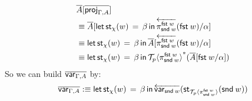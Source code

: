 \documentclass[10pt]{article}
\theoremstyle{definition}
\newcommand\dsd[1]{\ensuremath{\mathsf{#1}}}
\newcommand{\app}[2]{\ensuremath{#1 \: #2}}
\newcommand{\fst}[1]{\app{\dsd{fst}}{#1}}
\newcommand{\snd}[1]{\app{\dsd{snd}}{#1}}
\newcommand{\rewrite}[2]{\overleftarrow{#1}(#2)}
\newcommand\St[2]{\ensuremath{{#1}^*(#2)}}
\newcommand\StI[2]{\ensuremath{\mathsf{st}_{#1}(#2)}}
\newcommand\StE[4]{\ensuremath{\mathsf{let} \, \StI{#1}{#3} \, = \, {#2} \, \mathsf{in} \, #4}}
\newcommand\ApEl[2]{\mathcal{T}_{#1}\langle#2\rangle}
\begin{document}
\begin{enumerate}
\begin{align*}
&\upstairs{A}[\upstairs{\proj{\Gamma, A}}] \\
&\equiv \upstairs{A}[\StE{\chi}{\beta}{w}{\rewrite{\pi^{\fst w}_{\snd w}}{\fst w}}/\alpha] \\
&\equiv \StE{\chi}{\beta}{w}{\upstairs{A}[\rewrite{\pi^{\fst w}_{\snd w}}{\fst w}/\alpha]} \\
&\equiv \StE{\chi}{\beta}{w}{\St{\ApEl{p}{\pi^{\fst w}_{\snd w}}}{\upstairs{A}[\fst w/\alpha]}} 
\end{align*}
So we can build $\overline{\mathsf{var}_{\Gamma, A}}$ by:
\begin{align*}
\upstairs{\var{\Gamma, A}} :\equiv \StE{\chi}{\beta}{w}{\rewrite{\var{\snd w}}{\StI{\ApEl{p}{\pi^{\fst w}_{\snd w}}}{\snd w}}}
\end{align*}
\end{enumerate}
\end{document}
